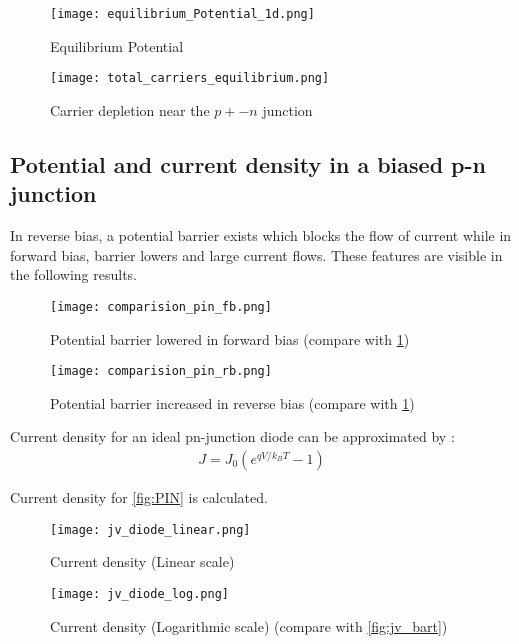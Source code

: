 \begin{figure}[h!]
     \centering
        \texttt{[image: equilibrium\_Potential\_1d.png]}
         \caption{Equilibrium Potential}
         \label{fig:pot_1d}	
     \end{figure}
     
\begin{figure}[h!]
     \centering
        \texttt{[image: total\_carriers\_equilibrium.png]}
         \caption{Carrier depletion near the $p+-n$ junction}
         \label{fig:car_1d}	
     \end{figure}     

\subsection{Potential and current density in a biased p-n junction}
In reverse bias, a potential barrier exists which blocks the flow of current while in forward bias, barrier lowers and large current flows. These features are visible in the following results.
 
\begin{figure}[h!]
     \centering
        \texttt{[image: comparision\_pin\_fb.png]}
         \caption{Potential barrier lowered in forward bias (compare with \ref{fig:pot_1d})}
         \label{fig:pot_fb}
     \end{figure}
     
\begin{figure}[h!]
     \centering
        \texttt{[image: comparision\_pin\_rb.png]}
         \caption{Potential barrier increased in reverse bias (compare with \ref{fig:pot_1d})}
         \label{fig:pot_fb}
     \end{figure}     

Current density for an ideal pn-junction diode \cite{bart} can be approximated by :
\begin{align*}
J = J_0 (e^{qV/k_BT}-1) 
\end{align*}


Current density for \ref{fig:PIN} is calculated.

\begin{figure}[h!]
     \centering
        \texttt{[image: jv\_diode\_linear.png]}
         \caption{Current density (Linear scale)}
         \label{fig:jv}
     \end{figure}

\begin{figure}[h!]
     \centering
        \texttt{[image: jv\_diode\_log.png]}
         \caption{Current density (Logarithmic scale) (compare with \ref{fig:jv_bart})}
		 \label{fig:jvl}     
     \end{figure}

